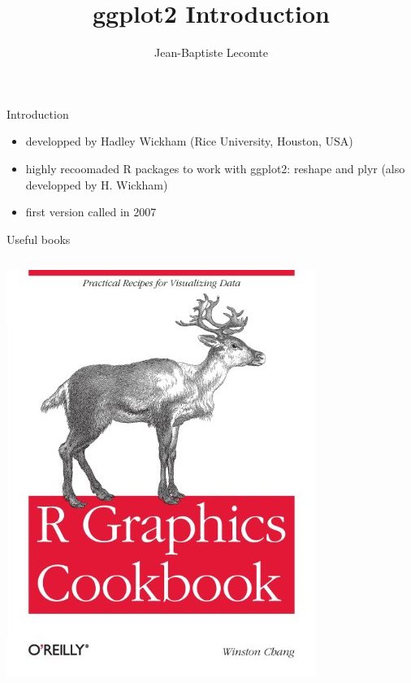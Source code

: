 \documentclass{beamer}\usepackage[]{graphicx}\usepackage[]{color}
\title{ggplot2 Introduction}
\author{Jean-Baptiste Lecomte}
\begin{document}
\maketitle


\begin{frame}{Introduction}
  \begin{itemize}
    \item developped by Hadley Wickham (Rice University, Houston, USA)
    \item highly recoomaded R packages to work with ggplot2: reshape and plyr (also developped by H. Wickham)
    \item first version called in 2007
  \end{itemize}
\end{frame}

\begin{frame}{Useful books}

  \begin{columns}
    \begin{column}{0.5\textwidth}
      \includegraphics[scale=0.45]{rgraphicscookbook}
    \end{column}
  

\end{columns}
\end{frame}
\end{document}
